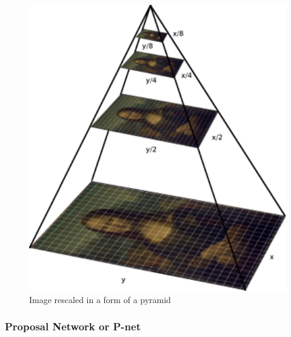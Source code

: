 \begin{figure}[!htb]
    \centering
    \includegraphics[width=1\textwidth]{figures/pyramid.png}
    \caption{ Image rescaled in a form of a pyramid \cite{imagepyramid} }
    \label{fig:pyramid}
\end{figure}

\subsubsection{Proposal Network or P-net}

